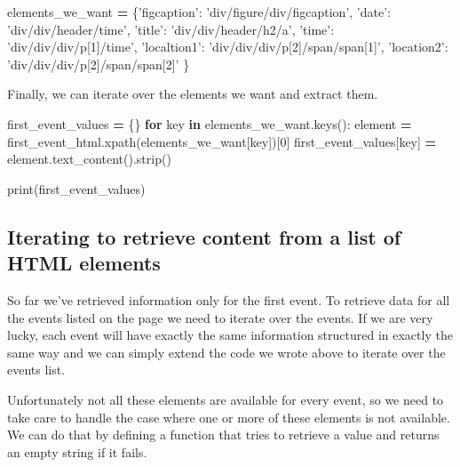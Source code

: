 \documentclass[]{book}
\newenvironment{Shaded}{\begin{snugshade}}{\end{snugshade}}
\newcommand{\KeywordTok}[1]{\textcolor[rgb]{0.13,0.29,0.53}{\textbf{#1}}}
\newcommand{\DecValTok}[1]{\textcolor[rgb]{0.00,0.00,0.81}{#1}}
\newcommand{\StringTok}[1]{\textcolor[rgb]{0.31,0.60,0.02}{#1}}
\newcommand{\ControlFlowTok}[1]{\textcolor[rgb]{0.13,0.29,0.53}{\textbf{#1}}}
\newcommand{\OperatorTok}[1]{\textcolor[rgb]{0.81,0.36,0.00}{\textbf{#1}}}
\newcommand{\BuiltInTok}[1]{#1}
\newcommand{\NormalTok}[1]{#1}
\begin{document}
\begin{Shaded}
\begin{Highlighting}[]
\NormalTok{elements_we_want }\OperatorTok{=}\NormalTok{ \{}\StringTok{'figcaption'}\NormalTok{: }\StringTok{'div/figure/div/figcaption'}\NormalTok{,}
                    \StringTok{'date'}\NormalTok{: }\StringTok{'div/div/header/time'}\NormalTok{,}
                    \StringTok{'title'}\NormalTok{: }\StringTok{'div/div/header/h2/a'}\NormalTok{,}
                    \StringTok{'time'}\NormalTok{: }\StringTok{'div/div/div/p[1]/time'}\NormalTok{,}
                    \StringTok{'localtion1'}\NormalTok{: }\StringTok{'div/div/div/p[2]/span/span[1]'}\NormalTok{,}
                    \StringTok{'location2'}\NormalTok{: }\StringTok{'div/div/div/p[2]/span/span[2]'}
\NormalTok{                    \}}
\end{Highlighting}
\end{Shaded}

Finally, we can iterate over the elements we want and extract them.

\begin{Shaded}
\begin{Highlighting}[]
\NormalTok{first_event_values }\OperatorTok{=}\NormalTok{ \{\}}
\ControlFlowTok{for}\NormalTok{ key }\KeywordTok{in}\NormalTok{ elements_we_want.keys():}
\NormalTok{    element }\OperatorTok{=}\NormalTok{ first_event_html.xpath(elements_we_want[key])[}\DecValTok{0}\NormalTok{]}
\NormalTok{    first_event_values[key] }\OperatorTok{=}\NormalTok{ element.text_content().strip()}

\BuiltInTok{print}\NormalTok{(first_event_values)}
\end{Highlighting}
\end{Shaded}

\subsection{Iterating to retrieve content from a list of HTML
elements}\label{iterating-to-retrieve-content-from-a-list-of-html-elements}

So far we've retrieved information only for the first event. To retrieve
data for all the events listed on the page we need to iterate over the
events. If we are very lucky, each event will have exactly the same
information structured in exactly the same way and we can simply extend
the code we wrote above to iterate over the events list.

Unfortunately not all these elements are available for every event, so
we need to take care to handle the case where one or more of these
elements is not available. We can do that by defining a function that
tries to retrieve a value and returns an empty string if it fails.
\end{document}
